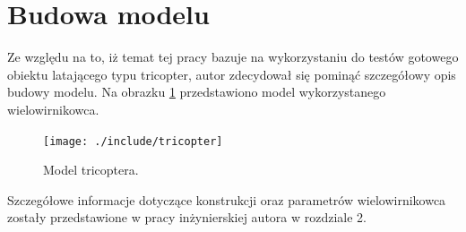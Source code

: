 \section{Budowa modelu}
Ze względu na to, iż temat tej pracy bazuje na wykorzystaniu do testów gotowego obiektu latającego typu tricopter, autor zdecydował się pominąć szczegółowy opis budowy modelu. Na obrazku \ref{pic:tricopter} przedstawiono model wykorzystanego wielowirnikowca.

\begin{figure}[!htbp]
\centering
\texttt{[image: ./include/tricopter]}
\caption{Model tricoptera.}
\label{pic:tricopter}
\end{figure}

Szczegółowe informacje dotyczące konstrukcji oraz parametrów wielowirnikowca zostały przedstawione w pracy inżynierskiej autora w rozdziale 2. %



